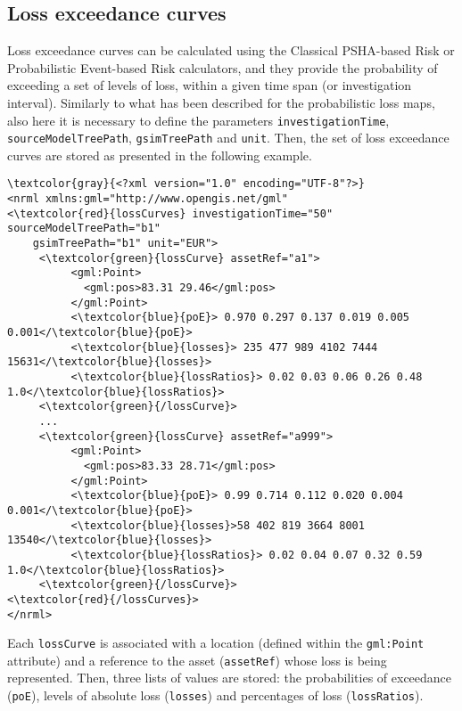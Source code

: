 \subsection{Loss exceedance curves}

Loss exceedance curves can be calculated using the Classical PSHA-based Risk
or Probabilistic Event-based Risk calculators, and they provide the
probability of exceeding a set of levels of loss, within a given time span (or
investigation interval). Similarly to what has been described for the
probabilistic loss maps, also here it is necessary to define the parameters
\Verb+investigationTime+, \Verb+sourceModelTreePath+, \Verb+gsimTreePath+ and
\Verb+unit+. Then, the set of loss exceedance curves are stored as presented
in the following example.

\begin{Verbatim}[frame=single, commandchars=\\\{\}, samepage=false]
\textcolor{gray}{<?xml version="1.0" encoding="UTF-8"?>}
<nrml xmlns:gml="http://www.opengis.net/gml"
<\textcolor{red}{lossCurves} investigationTime="50" sourceModelTreePath="b1"
    gsimTreePath="b1" unit="EUR">
     <\textcolor{green}{lossCurve} assetRef="a1">
          <gml:Point>
            <gml:pos>83.31 29.46</gml:pos>
          </gml:Point>
          <\textcolor{blue}{poE}> 0.970 0.297 0.137 0.019 0.005 0.001</\textcolor{blue}{poE}>
          <\textcolor{blue}{losses}> 235 477 989 4102 7444 15631</\textcolor{blue}{losses}>
          <\textcolor{blue}{lossRatios}> 0.02 0.03 0.06 0.26 0.48 1.0</\textcolor{blue}{lossRatios}>
     <\textcolor{green}{/lossCurve}>
     ...
     <\textcolor{green}{lossCurve} assetRef="a999">
          <gml:Point>
            <gml:pos>83.33 28.71</gml:pos>
          </gml:Point>
          <\textcolor{blue}{poE}> 0.99 0.714 0.112 0.020 0.004 0.001</\textcolor{blue}{poE}>
          <\textcolor{blue}{losses}>58 402 819 3664 8001 13540</\textcolor{blue}{losses}>
          <\textcolor{blue}{lossRatios}> 0.02 0.04 0.07 0.32 0.59 1.0</\textcolor{blue}{lossRatios}>
     <\textcolor{green}{/lossCurve}>
<\textcolor{red}{/lossCurves}>
</nrml>
\end{Verbatim}

Each \Verb+lossCurve+ is associated with a location (defined within the
\Verb+gml:Point+ attribute) and a reference to the \gls{asset}
(\Verb+assetRef+) whose loss is being represented. Then, three lists of values
are stored: the probabilities of exceedance (\Verb+poE+), levels of absolute
loss (\Verb+losses+) and percentages of loss (\Verb+lossRatios+).

